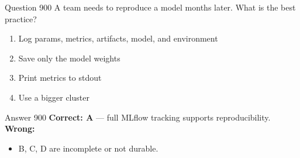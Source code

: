 \documentclass[aspectratio=169,11pt]{beamer}
\begin{document}
	\begin{frame}{Question 900}
		A team needs to reproduce a model months later. What is the best practice?
		\begin{enumerate}[label=\Alph*.]
			\item Log params, metrics, artifacts, model, and environment
			\item Save only the model weights
			\item Print metrics to stdout
			\item Use a bigger cluster
		\end{enumerate}
	\end{frame}
	\begin{frame}{Answer 900}
		\textbf{Correct: A} --- full MLflow tracking supports reproducibility.\\
		\vspace{0.5em}
		\textbf{Wrong:}
		\begin{itemize}
			\item B, C, D are incomplete or not durable.
		\end{itemize}
	\end{frame}
	
\end{document}

